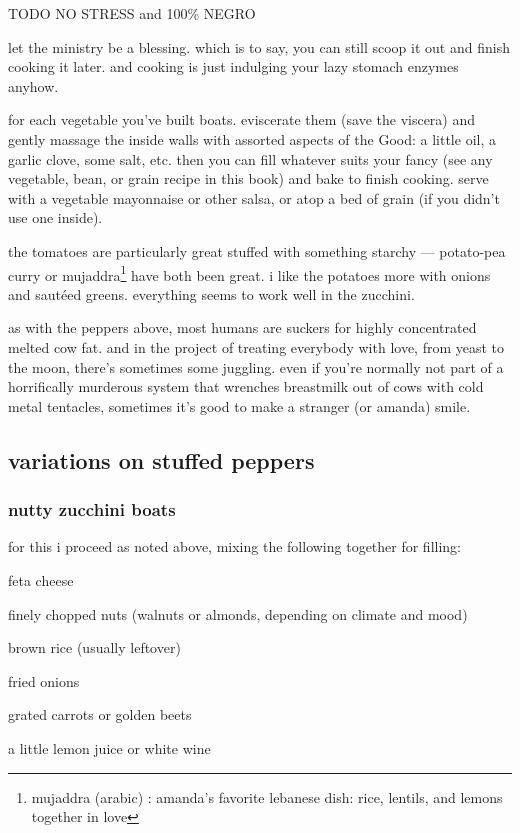 TODO
		NO STRESS
	and
		100\% NEGRO

let the ministry be a blessing. which is to say, you can still scoop it out 
and finish cooking it later. and cooking is just indulging your lazy stomach 
enzymes anyhow. 

for each vegetable you've built boats. eviscerate them (save the viscera) and 
gently massage the inside walls with assorted aspects of the Good: a little 
oil, a garlic clove, some salt, etc. then you can fill whatever suits your 
fancy (see any vegetable, bean, or grain recipe in this book) and bake to 
finish cooking. serve with a vegetable mayonnaise or other salsa, or atop a 
bed of grain (if you didn't use one inside).

the tomatoes are particularly great stuffed with something starchy --- 
potato-pea curry or mujaddra\footnote{mujaddra (arabic) : amanda's favorite 
lebanese dish: rice, lentils, and lemons together in love} have both been 
great. i like the potatoes more with onions and saut\'{e}ed greens. everything 
seems to work well in the zucchini.

as with the peppers above, most humans are suckers for highly concentrated 
melted cow fat. and in the project of treating everybody with love, from yeast 
to the moon, there's sometimes some juggling. even if you're normally not part 
of a horrifically murderous system that wrenches breastmilk out of cows with 
cold metal tentacles, sometimes it's good to make a stranger (or amanda) smile.

\subsection{variations on stuffed peppers}

\subsubsection{nutty zucchini boats}

for this i proceed as noted above, mixing the following together for filling:

\begin{ingredients}
  \item feta cheese
  \item finely chopped nuts (walnuts or almonds, depending on climate and mood)
  \item brown rice (usually leftover)
  \item fried onions
  \item grated carrots or golden beets
  \item a little lemon juice or white wine
\end{ingredients}

